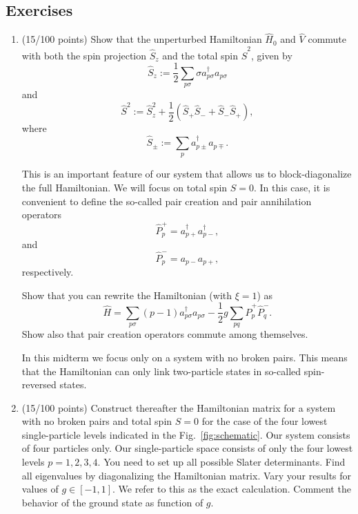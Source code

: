 \documentclass[prc]{revtex4}
\begin{document}
\subsection*{Exercises}

\begin{enumerate}
    \item (15/100 points) Show that the unperturbed Hamiltonian $\hat{H}_0$ and $\hat{V}$
        commute with both the spin projection $\hat{S}_z$ and the total spin
        $\hat{S}^2$, given by
        \[
            \hat{S}_z := \frac{1}{2}\sum_{p\sigma} \sigma
            a^\dag_{p\sigma}a_{p\sigma}
        \]
        and
        \[
            \hat{S}^2 := \hat{S}_z^2 + \frac{1}{2}(\hat{S}_+\hat{S}_- +
            \hat{S}_-\hat{S}_+),
        \]
        where
        \[
            \hat{S}_\pm := \sum_{p} a^\dag_{p\pm} a_{p\mp}.
        \]

        This is an important feature of our system that allows us to
        block-diagonalize the full Hamiltonian. We will focus on total spin
        $S=0$.  In this case, it is convenient to define the so-called pair
        creation and pair annihilation operators
        \[
            \hat{P}^{+}_p = a^\dag_{p+}a^\dag_{p-},
        \]
        and
        \[
            \hat{P}^{-}_p = a_{p-}a_{p+},
        \]
        respectively.

        Show that you can rewrite the Hamiltonian (with $\xi=1$) as
        \[
            \hat{H}=\sum_{p\sigma}(p-1)a_{p\sigma}^{\dagger}a_{p\sigma}
            -\frac{1}{2}g\sum_{pq}\hat{P}^{+}_p\hat{P}^{-}_q.
        \]
        Show also that pair creation operators  commute among themselves.

        In this midterm we focus only on a
        system with no broken pairs. This means that the Hamiltonian can only
        link two-particle states in so-called spin-reversed states.

    \item (15/100 points) Construct thereafter the Hamiltonian matrix for a system with no
        broken pairs and total spin $S=0$ for the case of the four lowest
        single-particle levels indicated in the
        Fig.~\ref{fig:schematic}. Our system consists of four particles
        only.  Our single-particle space consists of only the four lowest
        levels $p=1,2,3,4$.  You need to set up all possible Slater
        determinants.  Find all eigenvalues by diagonalizing the Hamiltonian
        matrix.  Vary your results for values of $g\in [-1,1]$.  We refer to
        this as the exact calculation. Comment the behavior of the ground
        state as function of $g$.


\end{enumerate}
\end{document}
